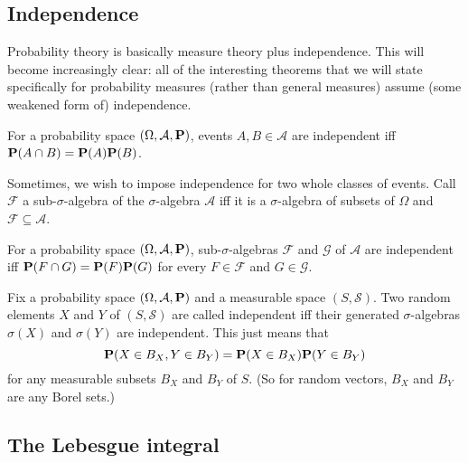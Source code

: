 \documentclass[11pt,letterpaper,reqno,oneside]{article}
\begin{document}
\subsection{Independence}
\label{sec:probability:independence}

Probability theory is basically measure theory plus independence. This will become increasingly clear: all of the interesting theorems that we will state specifically for probability measures (rather than general measures) assume (some weakened form of) independence.
%
\begin{definition}
	For a probability space $\left(\Omega,\mathcal{A},\mathbf{P}\right)$, events $A,B \in \mathcal{A}$ are independent iff $\mathbf{P}( A \cap B ) = \mathbf{P}(A) \mathbf{P}(B)$.
\end{definition}

Sometimes, we wish to impose independence for two whole classes of events. Call $\mathcal{F}$ a sub-$\sigma$-algebra of the $\sigma$-algebra $\mathcal{A}$ iff it is a $\sigma$-algebra of subsets of $\Omega$ and $\mathcal{F} \subseteq \mathcal{A}$.
%
\begin{definition}
	For a probability space $\left(\Omega,\mathcal{A},\mathbf{P}\right)$, sub-$\sigma$-algebras $\mathcal{F}$ and $\mathcal{G}$ of $\mathcal{A}$ are independent iff $\mathbf{P}( F \cap G ) = \mathbf{P}(F) \mathbf{P}(G)$ for every $F \in \mathcal{F}$ and $G \in \mathcal{G}$.
\end{definition}


Fix a probability space $\left(\Omega,\mathcal{A},\mathbf{P}\right)$ and a measurable space $(S,\mathcal{S})$. Two random elements $X$ and $Y$ of $(S,\mathcal{S})$ are called independent iff their generated $\sigma$-algebras $\sigma(X)$ and $\sigma(Y)$ are independent. This just means that
%
\begin{equation*}
	\mathbf{P}( X \in B_X, Y \in B_Y ) = \mathbf{P}( X \in B_X ) \mathbf{P}( Y \in B_Y )
\end{equation*}
%
for any measurable subsets $B_X$ and $B_Y$ of $S$. (So for random vectors, $B_X$ and $B_Y$ are any Borel sets.)



\subsection{The Lebesgue integral}
\label{sec:probability:Lebesgue_integral}
\end{document}
